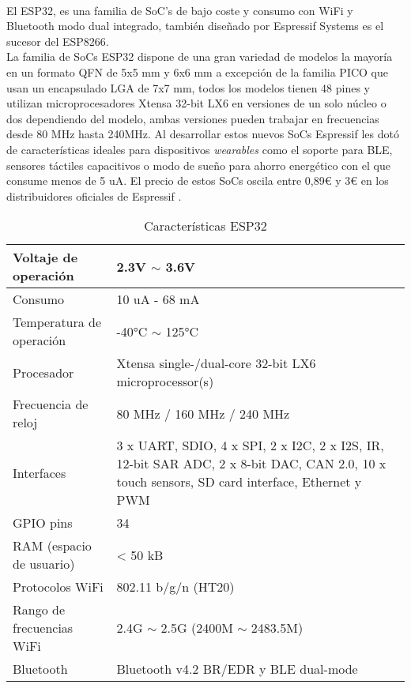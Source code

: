 \documentclass[../proyecto.tex]{subfiles}
\begin{document}
\\

El ESP32, es una familia de SoC's de bajo coste y consumo con WiFi y Bluetooth modo dual integrado, también diseñado por Espressif Systems \cite{esp32_overview} es el sucesor del ESP8266.\\

La familia de SoCs ESP32 dispone de una gran variedad de modelos la mayoría en un formato QFN de 5x5 mm y 6x6 mm a excepción de la familia PICO que usan un encapsulado LGA de 7x7 mm, todos los modelos tienen 48 pines y utilizan microprocesadores Xtensa 32-bit LX6 en versiones de un solo núcleo o dos dependiendo del modelo, ambas versiones pueden trabajar en frecuencias desde 80 MHz hasta 240MHz. Al desarrollar estos nuevos SoCs Espressif les dotó de características ideales para dispositivos \textit{wearables} como el soporte para BLE, sensores táctiles capacitivos o modo de sueño para ahorro energético con el que consume menos de 5  uA. El precio de estos SoCs oscila entre 0,89€ y 3€ en los distribuidores oficiales de Espressif \cite{espressif_provider_digikey} \cite{espressif_provider_mouser}.\\

\begin{table}[H]
\centering
\begin{tabular}{ |l|m{20em}| }
\hline
Voltaje de operación      & 2.3V $\sim$ 3.6V          \\ \hline
Consumo                   & 10 uA - 68 mA  \\ \hline
Temperatura de operación  & -40°C $\sim$ 125°C        \\ \hline
Procesador                & Xtensa single-/dual-core 32-bit LX6 microprocessor(s)   \\ \hline
Frecuencia de reloj       & 80 MHz / 160 MHz  / 240 MHz        \\ \hline
Interfaces                & 3 x UART, SDIO, 4 x SPI, 2 x I2C, 2 x I2S, IR, 12-bit SAR ADC, 2 x 8-bit DAC, CAN 2.0, 10 x touch sensors, SD card interface, Ethernet y PWM                           \\ \hline
GPIO pins                 & 34                        \\ \hline
RAM (espacio de usuario)  & < 50 kB                     \\ \hline
Protocolos WiFi           & 802.11 b/g/n (HT20)       \\ \hline
Rango de frecuencias WiFi & 2.4G $\sim$ 2.5G (2400M $\sim$ 2483.5M) \\ \hline
Bluetooth           &  Bluetooth v4.2 BR/EDR y BLE dual-mode  \\ \hline
\end{tabular}
\caption{Características ESP32}
\label{table:caracteristicas_esp32}
\end{table}
\end{document}
